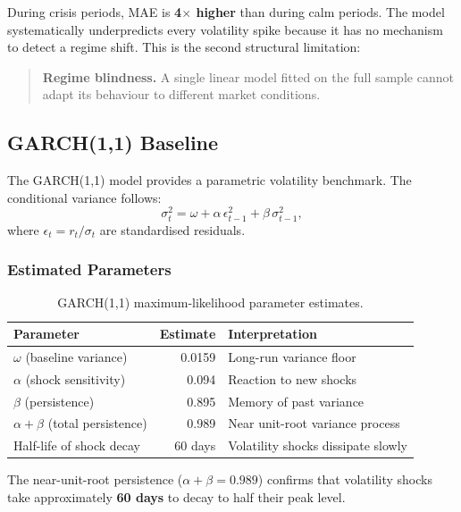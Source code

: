 During crisis periods, MAE is \textbf{4$\times$ higher} than during calm periods. The
model systematically underpredicts every volatility spike because it has no mechanism
to detect a regime shift. This is the second structural limitation:

\begin{quote}
  \textbf{Regime blindness.} A single linear model fitted on the full sample cannot
  adapt its behaviour to different market conditions.
\end{quote}

\subsection{GARCH(1,1) Baseline}

The GARCH(1,1) model provides a parametric volatility
benchmark. The conditional variance follows:
\[
  \sigma_t^2 = \omega + \alpha \, \epsilon_{t-1}^2 + \beta \, \sigma_{t-1}^2,
\]
where $\epsilon_t = r_t / \sigma_t$ are standardised residuals.

\subsubsection{Estimated Parameters}

\begin{table}[H]
  \centering
  \caption{GARCH(1,1) maximum-likelihood parameter estimates.}
  \label{tab:garch_params}
  \begin{tabular}{lrl}
    \toprule
    Parameter & Estimate & Interpretation \\
    \midrule
    $\omega$ (baseline variance) & 0.0159 & Long-run variance floor \\
    $\alpha$ (shock sensitivity) & 0.094  & Reaction to new shocks \\
    $\beta$  (persistence)       & 0.895  & Memory of past variance \\
    \midrule
    $\alpha + \beta$ (total persistence) & 0.989 & Near unit-root variance process \\
    Half-life of shock decay             & 60 days & Volatility shocks dissipate slowly \\
    \bottomrule
  \end{tabular}
\end{table}

The near-unit-root persistence ($\alpha + \beta = 0.989$) confirms that volatility
shocks take approximately \textbf{60 days} to decay to half their peak level.

